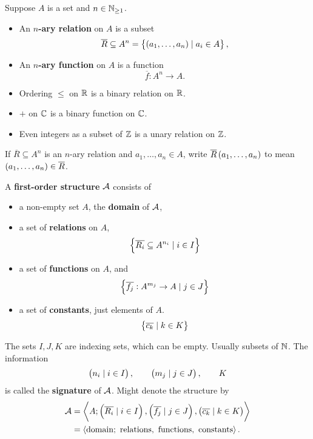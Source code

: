 \begin{definition}
Suppose $ A $ is a set and $ n \in \N_{\ge 1} $.
\begin{itemize}
\item An \textbf{$ n $-ary relation} on $ A $ is a subset
$$ \overline{R} \subseteq A^n = \cbr{\br{a_1, \dots, a_n} \mid a_i \in A}, $$
\item An \textbf{$ n $-ary function} on $ A $ is a function
$$ \overline{f} : A^n \to A. $$
\end{itemize}
\end{definition}

\begin{example*}
\hfill
\begin{itemize}
\item Ordering $ \le $ on $ \R $ is a binary relation on $ \R $.
\item $ + $ on $ \C $ is a binary function on $ \C $.
\item Even integers as a subset of $ \Z $ is a unary relation on $ \Z $.
\end{itemize}
\end{example*}

\begin{notation*}
If $ \overline{R} \subseteq A^n $ is an $ n $-ary relation and $ a_1, \dots, a_n \in A $, write $ \overline{R}\br{a_1, \dots, a_n} $ to mean $ \br{a_1, \dots, a_n} \in \overline{R} $.
\end{notation*}

\begin{definition}
A \textbf{first-order structure} $ \AA $ consists of
\begin{itemize}
\item a non-empty set $ A $, the \textbf{domain} of $ \AA $,
\item a set of \textbf{relations} on $ A $,
$$ \cbr{\overline{R_i} \subseteq A^{n_i} \mid i \in I} $$
\item a set of \textbf{functions} on $ A $, and
$$ \cbr{\overline{f_j} : A^{m_j} \to A \mid j \in J} $$
\item a set of \textbf{constants}, just elements of $ A $.
$$ \cbr{\overline{c_k} \mid k \in K} $$
\end{itemize}
The sets $ I, J, K $ are indexing sets, which can be empty. Usually subsets of $ \N $. The information
$$ \br{n_i \mid i \in I}, \qquad \br{m_j \mid j \in J}, \qquad K $$
is called the \textbf{signature} of $ \AA $. Might denote the structure by
\begin{align*}
\AA
& = \abr{A; \br{\overline{R_i} \mid i \in I}, \br{\overline{f_j} \mid j \in J}, \br{\overline{c_k} \mid k \in K}} \\
& = \abr{\text{domain}; \ \text{relations}, \ \text{functions}, \ \text{constants}}.
\end{align*}
\end{definition}

